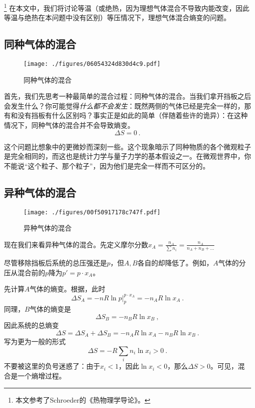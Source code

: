 

\footnote{本文参考了Schroeder的《热物理学导论》。} 在本文中，我们将讨论等温（或绝热，因为理想气体混合不导致内能改变，因此等温与绝热在本问题中没有区别）等压情况下，理想气体混合熵变的问题。

\subsection{同种气体的混合}
\begin{figure}[ht]
\centering
\texttt{[image: ./figures/06054324d830d4c9.pdf]}
\caption{同种气体的混合} \label{fig_IGME_1}
\end{figure}
首先，我们先思考一种最简单的混合过程：同种气体的混合。当我们拿开挡板之后会发生什么？你可能觉得\textsl{什么都不会发生}：既然两侧的气体已经是完全一样的，那有和没有挡板有什么区别吗？事实正是如此的简单（伴随着些许的诡异）：在这种情况下，同种气体的混合并不会导致熵变。
\begin{equation}
\Delta S = 0~.
\end{equation}


这个问题比想象中的更微妙而深刻一些。这个现象暗示了同种物质的各个微观粒子是完全相同的，而这也是统计力学与量子力学的基本假设之一。在微观世界中，你不能说“这个粒子、那个粒子”，因为他们是完全一样而不可区分的。

\subsection{异种气体的混合}
\begin{figure}[ht]
\centering
\texttt{[image: ./figures/00f50917178c747f.pdf]}
\caption{异种气体的混合} \label{fig_IGME_2}
\end{figure}

现在我们来看异种气体的混合。先定义摩尔分数$x_A = \frac{n_A}{\sum n_i} = \frac{n_A}{n_A+n_B+...}$

尽管移除挡板后系统的总压强还是$p$，但$A, B$各自的却降低了。例如，$A$气体的分压从混合前的$p$降为$p'=p \cdot x_A$。

先计算$A$气体的熵变。根据，此时
$$
\Delta S_A=-nR\ln p |^{p \cdot x_A}_p=-n_A R \ln x_A~.
$$
同理，$B$气体的熵变是
$$
\Delta S_B=-n_B R \ln x_B~,
$$
因此系统的总熵变
$$
\Delta S = \Delta S_A+\Delta S_B= -n_A R \ln x_A - n_B R \ln x_B~.
$$
写为更为一般的形式
\begin{equation}
\Delta S = -R \sum_i n_i \ln x_i >0~.
\end{equation}
不要被这里的负号迷惑了：由于$x_i<1$，因此$\ln x_i < 0$，那么$\Delta S>0$。可见，混合是一个熵增过程。


